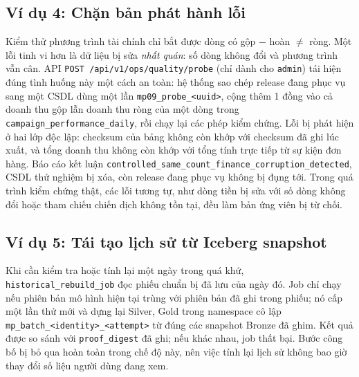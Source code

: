 \subsection{Ví dụ 4: Chặn bản phát hành lỗi}
\label{sec:c3-vi-du-4}
Kiểm thử phương trình tài chính chỉ bắt được dòng có gộp $-$ hoàn $\neq$ ròng. Một lỗi tinh vi hơn là dữ liệu bị sửa \emph{nhất quán}: số dòng không đổi và phương trình vẫn cân. API \texttt{POST /api/v1/ops/quality/probe} (chỉ dành cho \texttt{admin}) tái hiện đúng tình huống này một cách an toàn: hệ thống sao chép release đang phục vụ sang một CSDL dùng một lần \texttt{mp09\_probe\_<uuid>}, cộng thêm 1 đồng vào cả doanh thu gộp lẫn doanh thu ròng của một dòng trong \texttt{campaign\_performance\_daily}, rồi chạy lại các phép kiểm chứng. Lỗi bị phát hiện ở hai lớp độc lập: checksum của bảng không còn khớp với checksum đã ghi lúc xuất, và tổng doanh thu không còn khớp với tổng tính trực tiếp từ sự kiện đơn hàng. Báo cáo kết luận \texttt{controlled\_same\_count\_finance\_corruption\_detected}, CSDL thử nghiệm bị xóa, còn release đang phục vụ không bị đụng tới. Trong quá trình kiểm chứng thật, các lỗi tương tự, như dòng tiền bị sửa với số dòng không đổi hoặc tham chiếu chiến dịch không tồn tại, đều làm bản ứng viên bị từ chối.

\subsection{Ví dụ 5: Tái tạo lịch sử từ Iceberg snapshot}
\label{sec:c3-vi-du-5}
Khi cần kiểm tra hoặc tính lại một ngày trong quá khứ, \texttt{historical\_rebuild\_job} đọc phiếu chuẩn bị đã lưu của ngày đó. Job chỉ chạy nếu phiên bản mô hình hiện tại trùng với phiên bản đã ghi trong phiếu; nó cấp một lần thử mới và dựng lại Silver, Gold trong namespace cô lập \texttt{mp\_batch\_<identity>\_<attempt>} từ đúng các snapshot Bronze đã ghim. Kết quả được so sánh với \texttt{proof\_digest} đã ghi; nếu khác nhau, job thất bại. Bước công bố bị bỏ qua hoàn toàn trong chế độ này, nên việc tính lại lịch sử không bao giờ thay đổi số liệu người dùng đang xem.
